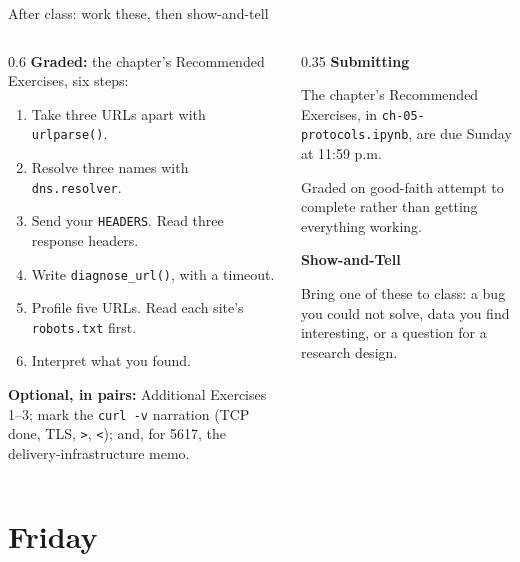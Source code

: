 \documentclass[9pt,aspectratio=169]{beamer}
\begin{document}
\begin{frame}{After class: work these, then show-and-tell}
    \begin{columns}[T]
        \begin{column}{0.6\textwidth}
            \textbf{Graded:} the chapter's Recommended Exercises, six steps:
            \begin{enumerate}\footnotesize
                \item Take three URLs apart with \texttt{urlparse()}.
                \item Resolve three names with \texttt{dns.resolver}.
                \item Send your \texttt{HEADERS}. Read three response headers.
                \item Write \texttt{diagnose\_url()}, with a timeout.
                \item Profile five URLs. Read each site's \texttt{robots.txt} first.
                \item Interpret what you found.
            \end{enumerate}

            \textbf{Optional, in pairs:} Additional Exercises 1--3; mark the \texttt{curl -v} narration (TCP done, TLS, \texttt{>}, \texttt{<}); and, for 5617, the delivery-infrastructure memo.
        \end{column}
        \begin{column}{0.35\textwidth}
            \textbf{Submitting}\\[2pt]
            {\footnotesize The chapter's Recommended Exercises, in \texttt{ch-05-protocols.ipynb}, are due Sunday at 11:59 p.m.

            \smallskip
            Graded on good-faith attempt to complete rather than getting everything working.\par}
            \medskip
            \textbf{Show-and-Tell}\\[2pt]
            {\footnotesize Bring one of these to class: a bug you could not solve, data you find interesting, or a question for a research design.\par}
        \end{column}
    \end{columns}
\end{frame}

\section{Friday}
\end{document}
